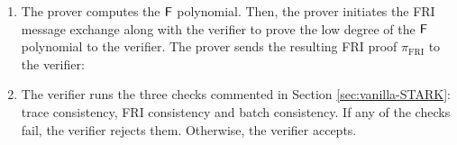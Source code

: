 \begin{protocol}
\begin{enumerate}
  \item The prover computes the $\textsf{F}$ polynomial. Then, the prover initiates the FRI message exchange along with the verifier to prove the low degree of the $\textsf{F}$ polynomial to the verifier. The prover sends the resulting FRI proof $\pi_{\text{FRI}}$ to the verifier: 

  \item The verifier runs the three checks commented in Section \ref{sec:vanilla-STARK}: trace consistency, FRI consistency and batch consistency. If any of the checks fail, the verifier rejects them. Otherwise, the verifier accepts.
\end{enumerate}
\end{protocol}

